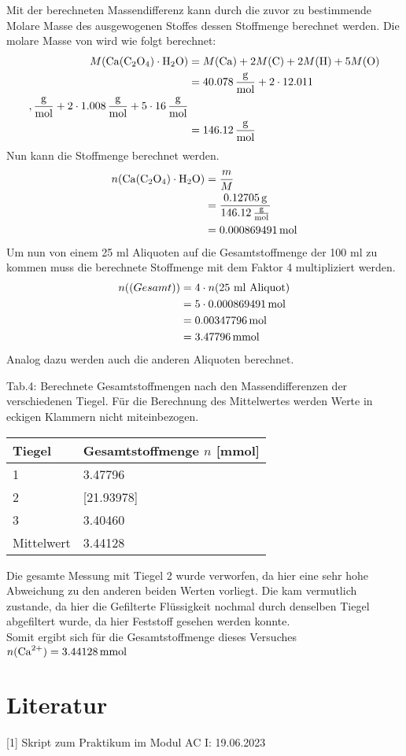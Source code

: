 \documentclass[12pt]{scrartcl} %
\begin{document}
Mit der berechneten Massendifferenz kann durch die zuvor zu bestimmende Molare Masse des ausgewogenen Stoffes dessen Stoffmenge berechnet werden.
Die molare Masse von  wird wie folgt berechnet:
\begin{align*}
  M(\ce{Ca(C2O4)\cdot H2O}) &= M(\ce{Ca}) + 2 M(\ce{C}) + 2 M(\ce{H}) + 5 M(\ce{O})\\
  &= 40.078\,\mathrm{\frac{g}{mol}} + 2\cdot  12.011\\,\mathrm{\frac{g}{mol}} + 2\cdot 1.008\,\mathrm{\frac{g}{mol}} + 5\cdot 16\,\mathrm{\frac{g}{mol}}\\
  &= 146.12\,\mathrm{\frac{g}{mol}}
\end{align*}
Nun kann die Stoffmenge berechnet werden.
\begin{align*}
  n(\ce{Ca(C2O4)\cdot H2O}) &= \frac{m}{M}\\
  &= \frac{0.12705\,\mathrm{g}}{146.12\,\mathrm{\frac{g}{mol}}}\\
  &= 0.000869491\,\mathrm{mol}
\end{align*}
Um nun von einem 25 ml Aliquoten auf die Gesamtstoffmenge der 100 ml zu kommen muss die berechnete Stoffmenge mit dem Faktor 4 multipliziert werden.
\begin{align*}
  n(\text(Gesamt)) &= 4 \cdot n(\text{25 ml  Aliquot})\\
  &= 5 \cdot 0.000869491\,\mathrm{mol}\\
  &= 0.00347796\,\mathrm{mol}\\
  &= 3.47796\,\mathrm{mmol}
\end{align*}
Analog dazu werden auch die anderen Aliquoten berechnet.\\
\begin{center}
  Tab.4: Berechnete Gesamtstoffmengen nach den Massendifferenzen der verschiedenen Tiegel. Für die Berechnung des Mittelwertes werden Werte in eckigen Klammern nicht miteinbezogen.\\
  \begin{tabular}{l l}
    \hline
    Tiegel & Gesamtstoffmenge $n$ [mmol]\\
    \hline
    1&3.47796\\
    2&[21.93978]\\
    3&3.40460\\
    \hline
    Mittelwert & 3.44128\\
    \hline
  \end{tabular}
\end{center}

Die gesamte Messung mit Tiegel 2 wurde verworfen, da hier eine sehr hohe Abweichung zu den anderen beiden Werten vorliegt. Die kam vermutlich zustande, da hier die Gefilterte Flüssigkeit nochmal durch denselben Tiegel abgefiltert wurde, da hier Feststoff gesehen werden konnte.\\
Somit ergibt sich für die Gesamtstoffmenge dieses Versuches $n(\ce{Ca^{2+}}) = 3.44128\,\mathrm{mmol}$

\section{Literatur}
[1] Skript zum Praktikum im Modul AC I: 19.06.2023
\end{document}
